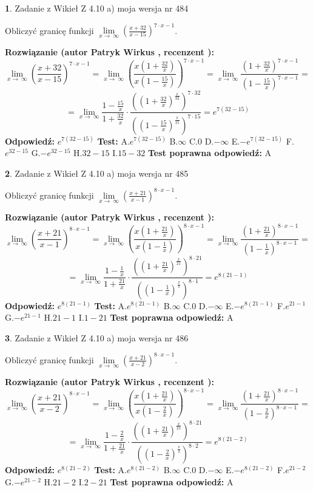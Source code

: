 \documentclass[12pt, a4paper]{article}
\theoremstyle{definition} %
\newtheorem{zad}{}
\newcommand{\zadStart}[1]{\begin{zad}#1\newline}
\newcommand{\zadStop}{\end{zad}}
\newcommand{\rozwStart}[2]{\noindent \textbf{Rozwiązanie (autor #1 , recenzent #2): }\newline}
\newcommand{\rozwStop}{\newline}
\newcommand{\odpStart}{\noindent \textbf{Odpowiedź:}\newline}
\newcommand{\odpStop}{\newline}
\newcommand{\testStart}{\noindent \textbf{Test:}\newline}
\newcommand{\testStop}{\newline}
\newcommand{\kluczStart}{\noindent \textbf{Test poprawna odpowiedź:}\newline}
\newcommand{\kluczStop}{\newline}
\begin{document}
\zadStart{Zadanie z Wikieł Z 4.10 a) moja wersja nr 484}


Obliczyć granicę funkcji  $\lim\limits_{x\to\ \infty}(\frac{x+32}{x-15})^{7\cdot x-1}$.
\zadStop
\rozwStart{Patryk Wirkus}{}
$$\lim\limits_{x\to\ \infty}(\frac{x+32}{x-15})^{7\cdot x-1} = \lim\limits_{x\to\ \infty}(\frac{x(1+\frac{32}{x})}{x(1-\frac{15}{x})})^{7\cdot x-1}=\lim\limits_{x\to\ \infty}\frac{(1+\frac{32}{x})^{7\cdot x-1}}{(1-\frac{15}{x})^{7\cdot x-1}}=$$
$$=\lim\limits_{x\to\ \infty}\frac{1-\frac{15}{x}}{1+\frac{32}{x}}\cdot\frac{((1+\frac{32}{x})^{\frac{x}{32}})^{7\cdot32}}{((1-\frac{15}{x})^{\frac{x}{15}})^{7\cdot15}}=e^{7(32-15)}$$
\rozwStop
\odpStart
$e^{7(32-15)}$
\odpStop
\testStart
A.$e^{7(32-15)}$ B.$\infty$ C.$0$ D.$-\infty$ E.$-e^{7(32-15)}$
F.$e^{32-15}$ G.$-e^{32-15}$
H.$32-15$
I.$15-32$
\testStop
\kluczStart
A
\kluczStop



\zadStart{Zadanie z Wikieł Z 4.10 a) moja wersja nr 485}


Obliczyć granicę funkcji  $\lim\limits_{x\to\ \infty}(\frac{x+21}{x-1})^{8\cdot x-1}$.
\zadStop
\rozwStart{Patryk Wirkus}{}
$$\lim\limits_{x\to\ \infty}(\frac{x+21}{x-1})^{8\cdot x-1} = \lim\limits_{x\to\ \infty}(\frac{x(1+\frac{21}{x})}{x(1-\frac{1}{x})})^{8\cdot x-1}=\lim\limits_{x\to\ \infty}\frac{(1+\frac{21}{x})^{8\cdot x-1}}{(1-\frac{1}{x})^{8\cdot x-1}}=$$
$$=\lim\limits_{x\to\ \infty}\frac{1-\frac{1}{x}}{1+\frac{21}{x}}\cdot\frac{((1+\frac{21}{x})^{\frac{x}{21}})^{8\cdot21}}{((1-\frac{1}{x})^{\frac{x}{1}})^{8\cdot1}}=e^{8(21-1)}$$
\rozwStop
\odpStart
$e^{8(21-1)}$
\odpStop
\testStart
A.$e^{8(21-1)}$ B.$\infty$ C.$0$ D.$-\infty$ E.$-e^{8(21-1)}$
F.$e^{21-1}$ G.$-e^{21-1}$
H.$21-1$
I.$1-21$
\testStop
\kluczStart
A
\kluczStop



\zadStart{Zadanie z Wikieł Z 4.10 a) moja wersja nr 486}


Obliczyć granicę funkcji  $\lim\limits_{x\to\ \infty}(\frac{x+21}{x-2})^{8\cdot x-1}$.
\zadStop
\rozwStart{Patryk Wirkus}{}
$$\lim\limits_{x\to\ \infty}(\frac{x+21}{x-2})^{8\cdot x-1} = \lim\limits_{x\to\ \infty}(\frac{x(1+\frac{21}{x})}{x(1-\frac{2}{x})})^{8\cdot x-1}=\lim\limits_{x\to\ \infty}\frac{(1+\frac{21}{x})^{8\cdot x-1}}{(1-\frac{2}{x})^{8\cdot x-1}}=$$
$$=\lim\limits_{x\to\ \infty}\frac{1-\frac{2}{x}}{1+\frac{21}{x}}\cdot\frac{((1+\frac{21}{x})^{\frac{x}{21}})^{8\cdot21}}{((1-\frac{2}{x})^{\frac{x}{2}})^{8\cdot2}}=e^{8(21-2)}$$
\rozwStop
\odpStart
$e^{8(21-2)}$
\odpStop
\testStart
A.$e^{8(21-2)}$ B.$\infty$ C.$0$ D.$-\infty$ E.$-e^{8(21-2)}$
F.$e^{21-2}$ G.$-e^{21-2}$
H.$21-2$
I.$2-21$
\testStop
\kluczStart
A
\kluczStop
\end{document}
